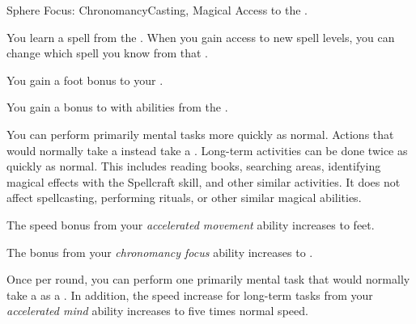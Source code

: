     \begin{feat}{Sphere Focus: Chronomancy}{Casting, Magical}
        \featpre Access to the  .

         You learn a spell from the  .
        When you gain access to new spell levels, you can change which spell you know from that .

         You gain a  foot bonus to your .

         You gain a  bonus to  with abilities from the  .

         You can perform primarily mental tasks more quickly as normal.
        Actions that would normally take a  instead take a .
        Long-term activities can be done twice as quickly as normal.
        This includes reading books, searching areas, identifying magical effects with the Spellcraft skill, and other similar activities.
        It does not affect spellcasting, performing rituals, or other similar magical abilities.

         The speed bonus from your \textit{accelerated movement} ability increases to  feet.

         The bonus from your \textit{chronomancy focus} ability increases to .

         Once per round, you can perform one primarily mental task that would normally take a  as a .
        In addition, the speed increase for long-term tasks from your \textit{accelerated mind} ability increases to five times normal speed.
    \end{feat}

